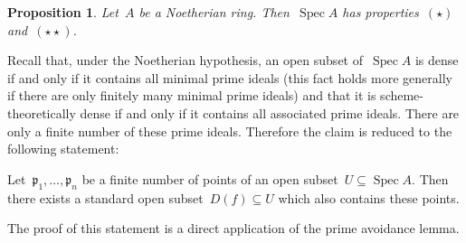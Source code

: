 \documentclass[10pt,reqno,a4paper]{amsbook}
\makeatletter
\theoremstyle{definition}
\theoremstyle{plain}
\newtheorem{prop}[defn]{Proposition}
\theoremstyle{remark}
\newcommand{\ppp}{\mathfrak{p}}
\DeclareMathOperator{\Spec}{Spec}
\newcommand{\?}{\,{:}\,}
\renewcommand{\_}{\mathpunct{.}\,}
\renewenvironment{proof}[1][\proofname]{\par
  \pushQED{\qed}%
  \normalfont \topsep6\p@\@plus6\p@\relax
  \trivlist
  \item[\hskip\labelsep
        \itshape
    #1\@addpunct{.}]\ignorespaces
}{%
  \popQED\endtrivlist\@endpefalse
}
\makeatother
\begin{document}
\begin{prop}Let~$A$ be a Noetherian ring. Then~$\Spec A$ has properties~$(\star)$
and~$(\star\star)$.
\end{prop}
\begin{proof}Recall that, under the Noetherian hypothesis, an open subset of~$\Spec A$ is dense if and only if it
contains all minimal prime ideals (this fact holds more generally if there are only finitely many minimal prime ideals) and that it
is scheme-theoretically dense if and only if it contains all associated prime
ideals. There are only a finite number of these prime ideals. Therefore the
claim is reduced to the following statement:

Let~$\ppp_1,\ldots,\ppp_n$ be a
finite number of points of an open subset~$U \subseteq \Spec A$. Then there
exists a standard open subset~$D(f) \subseteq U$ which also contains these
points.

The proof of this statement is a direct application of the prime
avoidance lemma.
\end{proof}
\end{document}

